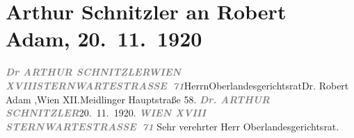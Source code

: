 

         
         \renewcommand{\erwaehntePersonen}{Personen: Robert Adam}
         \renewcommand{\erwaehnteInstitutionen}{Institutionen: Deutschösterreichischer Autorenverband}
         \renewcommand{\erwaehnteOrte}{Orte: IX., Alsergrund, Meidlinger Hauptstraße, Sternwartestraße, Wien, XII., Meidling, XVIII., Währing}
         \renewcommand{\erwaehnteWerke}{}
               \section[Arthur Schnitzler an Robert Adam, 20. 11. 1920]{ Arthur Schnitzler an Robert Adam, 20. 11. 1920}\nopagebreak{}\rehead{ }\begin{ledgroupsized}[t]{13cm}\normalsize\beginnumbering{} \toendnotes[C]{\smallbreak\pagebreak[2]} 
\toendnotes[C]{\smallbreak}\pstart{}{\pb}\textcolor{gray}{\textbf{\textit{Dr ARTHUR SCHNITZLER}}}\pend{}\pstart{}\textcolor{gray}{\textbf{\textit{WIEN XVIII}}}\pend{}\pstart{}\textcolor{gray}{\textbf{\textit{STERNWARTESTRASSE 71}}}\pend{}{\bigskip}\pstart{}{\pb}Herrn\pend{}\pstart{}Oberlandesgerichtsrat\pend{}\pstart{}Dr. Robert Adam ,\pend{}\pstart{}Wien XII.\pend{}\pstart{}Meidlinger Hauptstraße 58.\pend{}{\bigskip}\pstart
           \noindent{}{\pb}\textcolor{gray}{\textbf{\textit{Dr. ARTHUR SCHNITZLER}}}\hfill 20. 11. 1920.\pend
           \pstart
           \textcolor{gray}{\textbf{\textit{WIEN XVIII}}}\pend
           \pstart
           \textcolor{gray}{\textbf{\textit{STERNWARTESTRASSE 71}}}\pend
           \pstart{}Sehr verehrter Herr Oberlandesgerichtsrat.\pend\pstart

\end{ledgroupsized}

